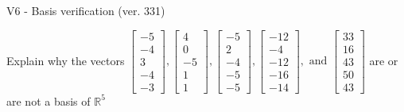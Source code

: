 \begin{exercise}
  \begin{exerciseTitle}V6 - Basis verification (ver. 331)\end{exerciseTitle}
  \begin{exerciseStatement}
    Explain why the vectors \(\left[\begin{array}{r}
-5 \\
-4 \\
3 \\
-4 \\
-3
\end{array}\right] , \left[\begin{array}{r}
4 \\
0 \\
-5 \\
1 \\
1
\end{array}\right] , \left[\begin{array}{r}
-5 \\
2 \\
-4 \\
-5 \\
-5
\end{array}\right] , \left[\begin{array}{r}
-12 \\
-4 \\
-12 \\
-16 \\
-14
\end{array}\right] , \text{ and } \left[\begin{array}{r}
33 \\
16 \\
43 \\
50 \\
43
\end{array}\right]\) are or are not a basis of \(\mathbb{R}^5\)	



\end{exerciseStatement}
\end{exercise}
